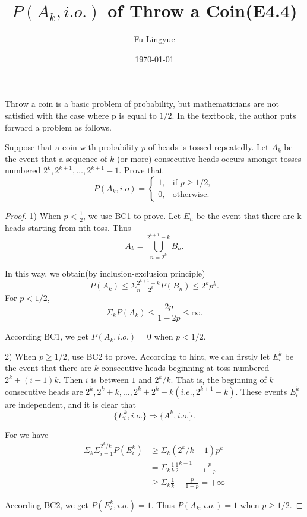 

\title{$P(A_k,i.o.)$ of Throw a Coin(E4.4)}
\author{Fu Lingyue}
\date{\today}


\maketitle

Throw a coin is a basic problem of probability, but mathematicians are not satisfied with the case where p is equal to $1/2$. In the textbook, the author puts forward a problem as follows.
\begin{theorem}
  Suppose that a coin with probability $p$ of heads is tossed repeatedly. Let $A_k$ be the event that a sequence of $k$ (or more) consecutive heads occurs amongst tosses numbered $2^k,2^{k+1},…,2^{k+1}-1$. Prove that
  \begin{equation}
  P(A_k,i.o) = 
    \begin{cases}
      1, & \text{if } p \geq 1/2,\\
      0, & \text{otherwise.}

    \end{cases}      
  \end{equation}

\end{theorem}
  
  
  \begin{proof}
1) When $p < \frac{1}{2}$, we use BC1 to prove. Let $E_n$ be the event that there are k heads starting from nth toss. Thus
  $$A_k = \bigcup_{n=2^k}^{2^{k+1}-k}B_n.$$
  
In this way, we obtain(by inclusion-exclusion principle)
$$
P(A_k) \leq \Sigma_{n=2^k}^{2^{k+1}-k}P(B_n) \leq 2^kp^k.
$$
  For $p<1/2$, 
  $$\Sigma_kP(A_k) \leq \frac{2p}{1-2p} \leq \infty.$$
  
  According BC1, we get $P(A_k,i.o.) = 0$ when $p<1/2.$
   
2) When $p\geq 1/2$, use BC2 to prove. According to hint, we can firstly let $E^k_i$ be the event that there are $k$ consecutive heads beginning at toss numbered $2^k+(i-1)k$. Then $i$ is between $1$ and $2^k/k$. That is, the beginning of $k$ consecutive heads are $2^k, 2^k + k, \dots ,2^{k} + 2^{k}-k(i.e.,2^{k+1}-k)$. These events $E_i^k$ are independent, and it is clear that 
   $$\{E_i^k,i.o.\} \Rightarrow \{A^k,i.o.\}.$$
   
   For we have 
   \begin{equation}
   \begin{aligned}
    \Sigma_k\Sigma_{i=1}^{2^k/k}P(E_i^k) &\geq \Sigma_k(2^k/k - 1)p^k \\
    &= \Sigma_k\frac{1}{k}\frac{1}{2}^{k-1} - \frac{p}{1-p}\\
    &\geq \Sigma_k\frac{1}{k} - \frac{p}{1-p} = +\infty
   \end{aligned}
 \end{equation} 
 
   According BC2, we get $P(E_i^k,i.o.) =1$. Thus $P(A_k,i.o.) = 1$ when $p\geq 1/2.$
  \end{proof}

